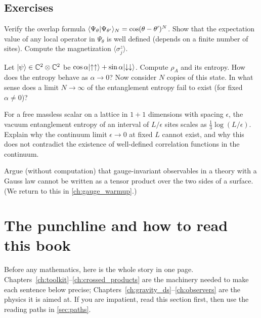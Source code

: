 \subsection*{Exercises}
\begin{exercise}\label{ex:why_algebras:1}
Verify the overlap formula $\langle \Psi_\theta\vert \Psi_{\theta'}\rangle_N=\cos(\theta-\theta')^N$. Show that the expectation value of any local operator in $\Psi_\theta$ is well defined (depends on a finite number of sites). Compute the magnetization $\langle\sigma^z_j\rangle$.
\end{exercise}
\begin{exercise}\label{ex:why_algebras:2}
Let $\lvert \psi\rangle\in\mathbb{C}^2\otimes\mathbb{C}^2$ be $\cos\alpha\lvert \uparrow\uparrow\rangle+\sin\alpha\lvert \downarrow\downarrow\rangle$. Compute $\rho_A$ and its entropy. How does the entropy behave as $\alpha\to0$? Now consider $N$ copies of this state. In what sense does a limit $N\to\infty$ of the entanglement entropy fail to exist (for fixed $\alpha\ne0$)?
\end{exercise}
\begin{exercise}\label{ex:why_algebras:3}
For a free massless scalar on a lattice in $1+1$ dimensions with spacing $\epsilon$, the vacuum entanglement entropy of an interval of $L/\epsilon$ sites scales as $\tfrac13\log(L/\epsilon)$. Explain why the continuum limit $\epsilon\to0$ at fixed $L$ cannot exist, and why this does not contradict the existence of well-defined correlation functions in the continuum.
\end{exercise}
\begin{exercise}\label{ex:why_algebras:4}
Argue (without computation) that gauge-invariant observables in a theory with a Gauss law cannot be written as a tensor product over the two sides of a surface. (We return to this in \cref{ch:gauge_warmup}.)
\end{exercise}

\section{The punchline and how to read this book}\label{ch:punchline}

\begin{physmotiv}
Before any mathematics, here is the whole story in one page. Chapters~\ref{ch:toolkit}--\ref{ch:crossed_products} are the machinery needed to make each sentence below precise; Chapters~\ref{ch:gravity_ds}--\ref{ch:observers} are the physics it is aimed at. If you are impatient, read this section first, then use the reading paths in \cref{sec:paths}.
\end{physmotiv}

